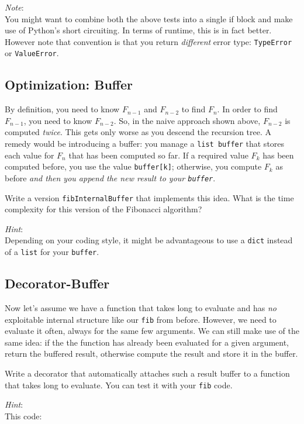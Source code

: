 \documentclass[
	english,
	fontsize=10pt,
	parskip=half,
	titlepage=true,
	DIV=12
]{scrartcl}
\newcommand*{\inPy}[1]{\texttt{#1}}
\begin{document}
\emph{Note}:\\
You might want to combine both the above tests into a single if block and make use of Python's short circuiting. In terms of runtime, this is in fact better. However note that convention is that you return \emph{different} error type: \inPy{TypeError} or \inPy{ValueError}.


\subsection{Optimization: Buffer}
By definition, you need to know $F_{n-1}$ and $F_{n-2}$ to find $F_n$. In order to find $F_{n-1}$, you need to know $F_{n-2}$. So, in the naive approach shown above, $F_{n-2}$ is computed \emph{twice}. This gets only worse as you descend the recursion tree. A remedy would be introducing a buffer: you manage a \inPy{list buffer} that stores each value for $F_n$ that has been computed so far. If a required value $F_k$ has been computed before, you use the value \texttt{buffer[k]}; otherwise, you compute $F_{k}$ as before \emph{and then you append the new result to your \texttt{buffer}}.

Write a version \texttt{fibInternalBuffer} that implements this idea. What is the time complexity for this version of the Fibonacci algorithm?

\emph{Hint}:\\
Depending on your coding style, it might be advantageous to use a \inPy{dict} instead of a \inPy{list} for your \texttt{buffer}.


\subsection{Decorator-Buffer}
Now let's assume we have a function that takes long to evaluate and has \emph{no} exploitable internal structure like our \texttt{fib} from before. However, we need to evaluate it often, always for the same few arguments. We can still make use of the same idea: if the the function has already been evaluated for a given argument, return the buffered result, otherwise compute the result and store it in the buffer.

Write a decorator that automatically attaches such a result buffer to a function that takes long to evaluate. You can test it with your \texttt{fib} code.

\emph{Hint}:\\
This code:
\end{document}
